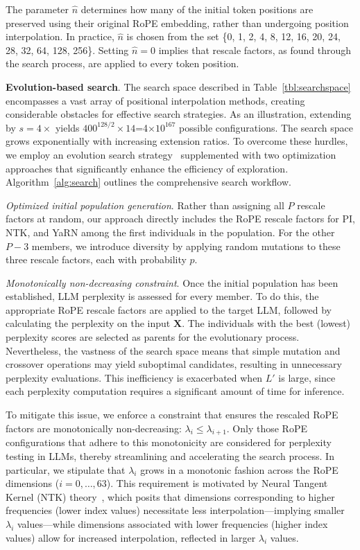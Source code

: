 The parameter $\hat{n}$ determines how many of the initial token positions are preserved using their original RoPE embedding, rather than undergoing position interpolation. In practice, $\hat{n}$ is chosen from the set \{0, 1, 2, 4, 8, 12, 16, 20, 24, 28, 32, 64, 128, 256\}. Setting $\hat{n}=0$ implies that rescale factors, as found through the search process, are applied to every token position.

\textbf{Evolution-based search}. The search space described in Table~\ref{tbl:searchspace} encompasses a vast array of positional interpolation methods, creating considerable obstacles for effective search strategies. As an illustration, extending by $s=4\times$ yields $400^{128/2}\times14$=4$\times10^{167}$ possible configurations. The search space grows exponentially with increasing extension ratios. To overcome these hurdles, we employ an evolution search strategy~\cite{guo2020single} supplemented with two optimization approaches that significantly enhance the efficiency of exploration. Algorithm~\ref{alg:search} outlines the comprehensive search workflow.

\textit{Optimized initial population generation}. Rather than assigning all $P$ rescale factors at random, our approach directly includes the RoPE rescale factors for PI, NTK, and YaRN among the first individuals in the population. For the other $P-3$ members, we introduce diversity by applying random mutations to these three rescale factors, each with probability $p$.

\textit{Monotonically non-decreasing constraint}. Once the initial population has been established, LLM perplexity is assessed for every member. To do this, the appropriate RoPE rescale factors are applied to the target LLM, followed by calculating the perplexity on the input $\mathbf{X}$. The individuals with the best (lowest) perplexity scores are selected as parents for the evolutionary process. Nevertheless, the vastness of the search space means that simple mutation and crossover operations may yield suboptimal candidates, resulting in unnecessary perplexity evaluations. This inefficiency is exacerbated when $L'$ is large, since each perplexity computation requires a significant amount of time for inference.

To mitigate this issue, we enforce a constraint that ensures the rescaled RoPE factors are monotonically non-decreasing: $\lambda_i \le \lambda_{i+1}$.
Only those RoPE configurations that adhere to this monotonicity are considered for perplexity testing in LLMs, thereby streamlining and accelerating the search process. In particular, we stipulate that $\lambda_i$ grows in a monotonic fashion across the RoPE dimensions ($i = 0, \ldots, 63$). This requirement is motivated by Neural Tangent Kernel (NTK) theory~\cite{jacot2018neural,tancik2020fourier,ntk}, which posits that dimensions corresponding to higher frequencies (lower index values) necessitate less interpolation—implying smaller $\lambda_i$ values—while dimensions associated with lower frequencies (higher index values) allow for increased interpolation, reflected in larger $\lambda_i$ values.

